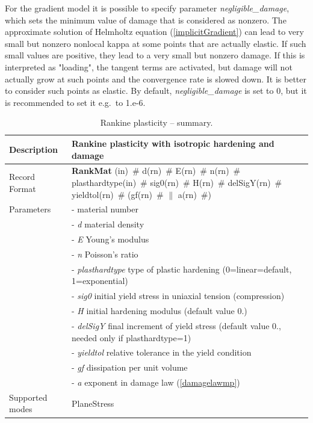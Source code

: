 \documentclass[a4paper]{article}
\newcommand{\descitem}[1]{{\noindent \bf #1}}
\newcommand{\elemparam}[2]{{{#1\tiny (#2)}~\#}}
\newcommand{\param}[1]{{\it #1}}
\newenvironment{mmt}{\begin{tabular}{|l|p{9cm}|}}{\end{tabular}\\}
\newenvironment{mmt}{\begin{tabular}{|l|l|}}{\end{tabular}\\}
\begin{document}
For the gradient model
it is possible to specify parameter \param{negligible\_damage}, which sets the minimum
value of damage that is considered as nonzero. 
The approximate solution of Helmholtz equation (\ref{implicitGradient}) can lead
    to very small but nonzero nonlocal kappa at some points that
    are actually elastic. If such small values are positive,
    they lead to a very small but nonzero damage. If this is
    interpreted as "loading", the tangent terms are activated,
    but damage will not actually grow at such points and the
    convergence rate is slowed down. It is better to consider
    such points as elastic. By default, \param{negligible\_damage} is set to 0,
but it is recommended to set it e.g.\ to 1.e-6.


\begin{table}[!htb]
\begin{mmt}
\hline
Description & Rankine plasticity with isotropic hardening and damage\\
\hline
Record Format & \descitem{RankMat}  \elemparam{}{in}
\elemparam{d}{rn} \elemparam{E}{rn} \elemparam{n}{rn} \elemparam{plasthardtype}{in} \elemparam{sig0}{rn} \elemparam{H}{rn} \elemparam{delSigY}{rn} \elemparam{yieldtol}{rn} (\elemparam{gf}{rn} $\|$ \elemparam{a}{rn}) \\
Parameters &- \param{} material number\\
&- \param{d} material density\\
&- \param{E} Young's modulus\\
&- \param{n} Poisson's ratio\\
&- \param{plasthardtype} type of plastic hardening (0=linear=default, 1=exponential)\\
&- \param{sig0} initial yield stress in uniaxial tension (compression)\\
&- \param{H} initial hardening modulus (default value 0.)\\
&- \param{delSigY} final increment of yield stress (default value 0., needed only if plasthardtype=1)\\
&- \param{yieldtol} relative tolerance in the yield condition\\
&- \param{gf} dissipation per unit volume\\
&- \param{a} exponent in damage law (\ref{damagelawmp})\\
Supported modes& PlaneStress\\
\hline
\end{mmt}
\caption{Rankine plasticity -- summary.}
\label{rankineMat_table}
\end{table}
\end{document}
